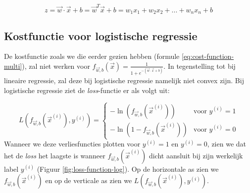 \begin{equation}
	z = \vec{w} \cdot \vec{x} + b = \vec{w}^{T}\vec{x} + b = w_{1}x_{1} + w_{2}x_{2} + ... + w_{n}x_{n} + b
\end{equation}

\subsection{Kostfunctie voor logistische regressie}

De kostfunctie zoals we die eerder gezien hebben (formule \ref{eq:cost-function-multi}), zal niet werken voor $f_{\vec{w},b}(\vec{x}) = \frac{1}{1 + e^{-(\vec{w} \cdot \vec{x} + b)}}$. In tegenstelling tot bij lineaire regressie, zal deze bij logistische regressie namelijk niet convex zijn. Bij logistische regressie ziet de \textit{loss}-functie er als volgt uit:

 \begin{equation}
 	L(f_{\vec{w},b}(\vec{x}^{(i)}), y^{(i)}) = \left\{ \begin{matrix} -\ln(f_{\vec{w},b}(\vec{x}^{(i)})) & \mbox{voor } y^{(i)} = 1 \\ -\ln(1 - f_{\vec{w},b}(\vec{x}^{(i)}))  & \mbox{voor } y^{(i)} = 0 \end{matrix}\right .
 	\label{eq:loss-function-log}
 \end{equation}
\noindent
Wanneer we deze verliesfuncties plotten voor $y^{(i)} = 1$ en $y^{(i)} = 0$, zien we dat het de \textit{loss} het laagste is wanneer $f_{\vec{w},b}(\vec{x}^{(i)})$ dicht aansluit bij zijn werkelijk label $y^{(i)}$ (Figuur \ref{fig:loss-function-log}). Op de horizontale as zien we $f_{\vec{w},b}(\vec{x}^{(i)})$ en op de verticale as zien we $L(f_{\vec{w},b}(\vec{x}^{(i)}), y^{(i)})$.

